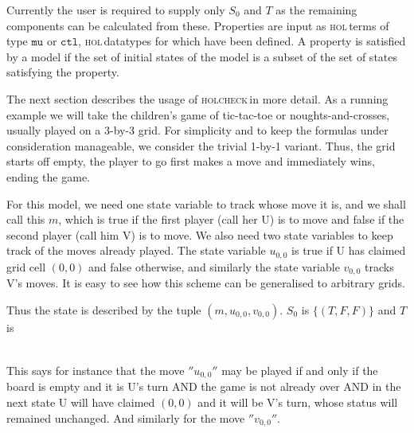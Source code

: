 \documentclass{article}
\newcommand{\hc}{\textsc{holcheck\,}}
\newcommand{\hol}{\textsc{hol\,}}
\begin{document}
Currently the user is required to supply only \( S_0 \) and \( T \) as the remaining components can be calculated from these. Properties are input as \hol terms of type \(\mathtt{mu}\) or \(\mathtt{ctl}\), \hol datatypes for which have been defined. A property is satisfied by a model if the set of initial states of the model is a subset of the set of states satisfying the property. 

The next section describes the usage of \hc in more detail. As a running example we will take the children's game of tic-tac-toe or noughts-and-crosses, usually played on a 3-by-3 grid. For simplicity and to keep the formulas under consideration manageable, we consider the trivial 1-by-1 variant. Thus, the grid starts off empty, the player to go first makes a move and immediately wins, ending the game.

For this model, we need one state variable to track whose move it is, and we shall call this \(m\), which is true if the first player (call her U) is to move and false if the second player (call him V) is to move. We also need two state variables to keep track of the moves already played. The state variable \(u_{0,0}\) is true if U has claimed grid cell \((0,0)\) and false otherwise, and similarly the state variable \(v_{0,0}\) tracks V's moves. It is easy to see how this scheme can be generalised to arbitrary grids.

Thus the state is described by the tuple \( (m,u_{0,0},v_{0,0}) \). \(S_0\) is \( \{ (T,F,F) \} \) and \( T \) is 

\begin{eqnarray*}
 [&(&''{u_{0,0}}'',(\lnot u_{0,0} \land \lnot v_{0,0} \land m) \land \lnot((\lnot m \land u_{0,0}) \lor (m \land v_{0,0}))\\
       &&\land (u_{0,0}' \land \lnot m' \land (v_{0,0}' = v_{0,0}))),\\
     &(&''{v_{0,0}}'',(\lnot v_{0,0} \land \lnot u_{0,0} \land \lnot m) \land \lnot((\lnot m \land u_{0,0}) \lor (m \land v_{0,0}))\\
        &&\land (v_{0,0}' \land m' \land (u_{0,0}' = u_{0,0})))]
\end{eqnarray*}

This says for instance that the move \(''{u_{0,0}}''\) may be played if and only if the board is empty and it is U's turn AND the game is not already over AND in the next state U will have claimed \((0,0)\) and it will be V's turn, whose status will remained unchanged. And similarly for the move \(''{v_{0,0}}''\). 
\end{document}
